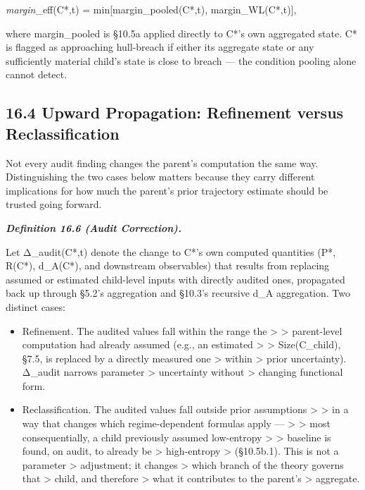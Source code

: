 \documentclass[
]{article}
\begin{document}
\emph{margin}\_eff(C*,t) = min{[}margin\_pooled(C*,t),
margin\_WL(C*,t){]},

where margin\_pooled is §10.5a applied directly to C*'s own aggregated
state. C* is flagged as approaching hull-breach if either its aggregate
state or any sufficiently material child's state is close to breach ---
the condition pooling alone cannot detect.

\hypertarget{upward-propagation-refinement-versus-reclassification}{%
\subsection{16.4 Upward Propagation: Refinement versus
Reclassification}\label{upward-propagation-refinement-versus-reclassification}}

Not every audit finding changes the parent's computation the same way.
Distinguishing the two cases below matters because they carry different
implications for how much the parent's prior trajectory estimate should
be trusted going forward.

\emph{\textbf{Definition 16.6 (Audit Correction).}}

Let Δ\_audit(C*,t) denote the change to C*'s own computed quantities
(P*, R(C*), d\_A(C*), and downstream observables) that results from
replacing assumed or estimated child-level inputs with directly audited
ones, propagated back up through §5.2's aggregation and §10.3's
recursive d\_A aggregation. Two distinct cases:

\begin{itemize}
\item
  Refinement. The audited values fall within the range the
  \textgreater{} \textgreater{} parent-level computation had already
  assumed (e.g., an estimated \textgreater{} \textgreater{}
  Size(C\_child), §7.5, is replaced by a directly measured one
  \textgreater{} within \textgreater{} prior uncertainty). Δ\_audit
  narrows parameter \textgreater{} uncertainty without \textgreater{}
  changing functional form.
\item
  Reclassification. The audited values fall outside prior assumptions
  \textgreater{} \textgreater{} in a way that changes which
  regime-dependent formulas apply --- \textgreater{} \textgreater{} most
  consequentially, a child previously assumed low-entropy \textgreater{}
  \textgreater{} baseline is found, on audit, to already be
  \textgreater{} high-entropy \textgreater{} (§10.5b.1). This is not a
  parameter \textgreater{} adjustment; it changes \textgreater{} which
  branch of the theory governs that \textgreater{} child, and therefore
  \textgreater{} what it contributes to the parent's \textgreater{}
  aggregate.
\end{itemize}
\end{document}
